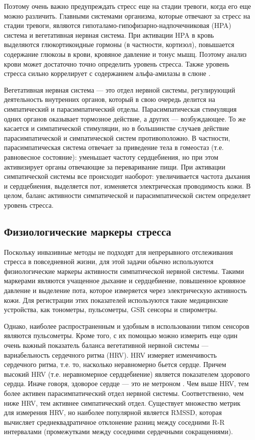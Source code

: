 \documentclass[14pt]{matmex-diploma-custom}
\begin{document}
Поэтому очень важно предупреждать стресс еще на стадии тревоги, когда его еще
можно различить. Главными системами организма, которые отвечают за стресс на
стадии тревоги, являются гипоталамо-гипофизарно-надпочечниковая (HPA) система и
вегетативная нервная система. При активации HPA в кровь выделяются
глюкортикоидные гормоны (в частности, кортизол), повышается содержание глюкозы в
крови, кровяное давление и тонус мышц. Поэтому анализ крови может достаточно
точно определить уровень стресса. Также уровень стресса сильно коррелирует с
содержанием альфа-амилазы в слюне \cite{article:alpha_amylase}.

Вегетативная нервная система --- это отдел нервной системы, регулирующий
деятельность внутренних органов, который в свою очередь делится на симпатический
и парасимпатический отделы. Парасимпатическая стимуляция одних органов оказывает
тормозное действие, а других --- возбуждающее. То же касается и симпатической
стимуляции, но в большинстве случаев действие парасимпатической и симпатической
систем противоположно. В частности, парасимпатическая система отвечает за
приведение тела в гомеостаз (т.е. равновесное состояние): уменьшает частоту
сердцебиения, но при этом активизирует органы отвечающие за переваривание пищи.
При активации симпатической системы все происходит наоборот: увеличивается
частота дыхания и сердцебиения, выделяется пот, изменяется электрическая
проводимость кожи. В целом, баланс активности симпатической и парасимпатической
систем определяет уровень стресса.

\subsection{Физиологические маркеры стресса}
Поскольку инвазивные методы не подходят для непрерывного отслеживания стресса в
повседневной жизни, для этой задачи обычно используются физиологические маркеры
активности симпатической нервной системы. Такими маркерами являются учащенное
дыхание и сердцебиение, повышенное кровяное давление и выделение пота, которое
измеряется через электрическую активность кожи. Для регистрации этих показателей
используются такие медицинские устройства, как тонометры, пульсометры, GSR
сенсоры и спирометры.

Однако, наиболее распространенным и удобным в использовании типом сенсоров
являются пульсометры. Кроме того, с их помощью можно измерить еще один очень
важный показатель баланса вегетативной нервной системы --- вариабельность
сердечного ритма (HRV). HRV измеряет изменчивость сердечного ритма, т.е. то,
насколько неравномерно бьется сердце. Причем высокий HRV (т.е. неравномерное
сердцебиение) является показателем здорового сердца. Иначе говоря, здоворое
сердце --- это не метроном \cite{article:not_metronome}. Чем выше HRV, тем более
активен парасимпатический отдел нервной системы. Соответственно, чем ниже HRV,
тем активнее симпатический отдел. Существует множество метрик для измерения HRV,
но наиболее популярной является RMSSD, которая вычисляет
среднеквадратичное отклонение разниц между соседними R-R интервалами
(промежутками между соседними сердечными сокращениями).
\end{document}
